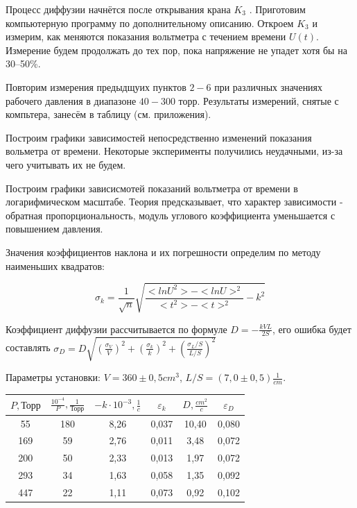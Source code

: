 \documentclass[a4paper, 12pt]{article} %
\begin{document}
Процесс диффузии начнётся после открывания крана $K_3$ . Приготовим компьютерную программу по дополнительному описанию. Откроем $K_3$ и измерим, как меняются показания вольтметра с течением времени $U(t)$. Измерение будем продолжать до тех пор, пока напряжение не упадет хотя бы на 30–50\%.

Повторим измерения предыдщуих пунктов $2 - 6$ при различных значениях рабочего давления в диапазоне $40 - 300$ торр. Результаты измерений, снятые с компьтера, занесём в таблицу (см. приложения).

Построим графики зависимостей непосредственно изменений показания вольметра от времени. Некоторые эксперименты получились неудачными, из-за чего учитывать их не будем. 

Построим графики зависисмотей показаний вольтметра от времени в логарифмическом масштабе. Теория предсказывает, что характер зависимости - обратная пропорциональность, модуль углового коэффициента уменьшается с повышением давления. 

Значения коэффициентов наклона и их погрешности определим по методу наименьших квадратов:

\begin{equation}
	\sigma_k = \frac{1}{\sqrt{n}}\sqrt{\frac{<ln U^2>-<ln U>^2}{<t^2>-<t>^2}-k^2}
\end{equation}

Коэффициент диффузии рассчитывается по формуле $D = -\frac{kVL}{2S}$, его ошибка будет составлять $\sigma_D = D\sqrt{(\frac{\sigma_V}{V})^2+(\frac{\sigma_k}{k})^2+(\frac{\sigma_L/S}{L/S})^2}$

Параметры установки: $V = 360 \pm 0,5 cm^3$, $L/S = (7,0 \pm 0,5) \frac{1}{cm}$.

\begin{center}
	\begin{tabular}{|c|c|c|c|c|c|}
		\hline 
		$P, \text{Торр}$ & $\frac{10^{-4}}{P}, \frac{1}{\text{Торр}}$ & $-k \cdot 10^{-3}, \frac{1}{c}$ & $\varepsilon_{k}$ & $D, \frac{cm^2}{c}$ & $\varepsilon_{D}$ \\ 
		\hline 
		55 & 180 & 8,26 & 0,037 & 10,40 & 0,080 \\ 
		\hline 
		169 & 59 & 2,76 & 0,011 & 3,48 & 0,072 \\ 
		\hline 
		200 & 50 & 2,33 & 0,013 & 1,97 & 0,072 \\ 
		\hline 
		293 & 34 & 1,63 & 0,058 & 1,35 & 0,092 \\ 
		\hline 
		447 & 22 & 1,11 & 0,073 & 0,92 & 0,102 \\ 
		\hline 
	\end{tabular} 
\end{center}
\end{document}
